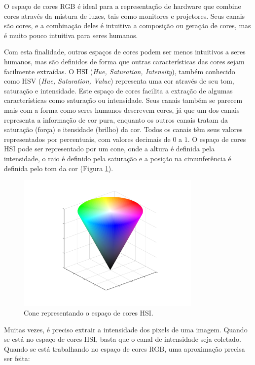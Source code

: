 O espaço de cores RGB é ideal para a representação de hardware que combine cores através da mistura de luzes, tais como monitores e projetores. Seus canais são cores, e a combinação deles é intuitiva a composição ou geração de cores, mas é muito pouco intuitiva para seres humanos.

Com esta finalidade, outros espaços de cores podem ser menos intuitivos a seres humanos, mas são definidos de forma que outras características das cores sejam facilmente extraídas. O HSI (\textit{Hue, Saturation, Intensity}), também conhecido como HSV (\textit{Hue, Saturation, Value}) representa uma cor através de seu tom, saturação e intensidade. Este espaço de cores facilita a extração de algumas características como saturação ou intensidade. Seus canais também se parecem mais com a forma como seres humanos descrevem cores, já que um dos canais representa a informação de cor pura, enquanto os outros canais tratam da saturação (força) e itensidade (brilho) da cor. Todos os canais têm seus valores representados por percentuais, com valores decimais de $0$ a $1$. O espaço de cores HSI pode ser representado por um cone, onde a altura é definida pela intensidade, o raio é definido pela saturação e a posição na circunferência é definida pelo tom da cor (Figura \ref{fig:hsi_cone}).

\begin{figure}[h]
  \centering
  \includegraphics[width=0.8\textwidth]{imgs/hsi_cone}
  \caption[Cone do espaço de cores HSI]{Cone representando o espaço de cores HSI.}
  \label{fig:hsi_cone}
\end{figure}

Muitas vezes, é preciso extrair a intensidade dos pixels de uma imagem. Quando se está no espaço de cores HSI, basta que o canal de intensidade seja coletado. Quando se está trabalhando no espaço de cores RGB, uma aproximação precisa ser feita:

